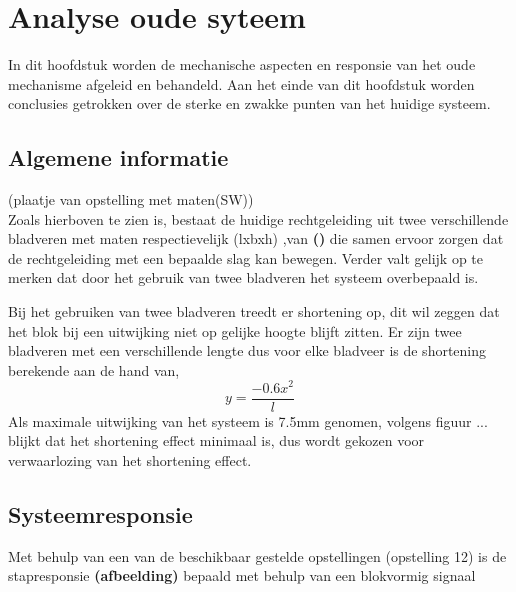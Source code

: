 \documentclass[a4paper]{article}
\begin{document}
\section{Analyse oude syteem}
In dit hoofdstuk worden de mechanische aspecten en responsie van het oude mechanisme afgeleid en behandeld. Aan het einde van dit hoofdstuk worden conclusies getrokken over de sterke en zwakke punten van het huidige systeem.

\subsection{Algemene informatie}
(plaatje van opstelling met maten(SW)) \\
Zoals hierboven te zien is, bestaat de huidige rechtgeleiding uit twee verschillende bladveren met maten respectievelijk (lxbxh) ,van \textbf{()} die samen ervoor zorgen dat de rechtgeleiding met een bepaalde slag kan bewegen. Verder valt gelijk op te merken dat door het gebruik van twee bladveren het systeem overbepaald is.

Bij het gebruiken van twee bladveren treedt er shortening op, dit wil zeggen dat het blok bij een uitwijking niet op gelijke hoogte blijft zitten. Er zijn twee bladveren met een verschillende lengte dus voor elke bladveer is de shortening berekende aan de hand van,
\begin{equation}
y=\frac{-0.6x^2}{l}
\end{equation}
Als maximale uitwijking van het systeem is 7.5mm genomen, volgens figuur ... blijkt dat het shortening effect minimaal is, dus wordt gekozen voor verwaarlozing van het shortening effect. 

\subsection{Systeemresponsie}
Met behulp van een van de beschikbaar gestelde opstellingen (opstelling 12) is de stapresponsie \textbf{(afbeelding)} bepaald met behulp van een blokvormig signaal

\end{document}

